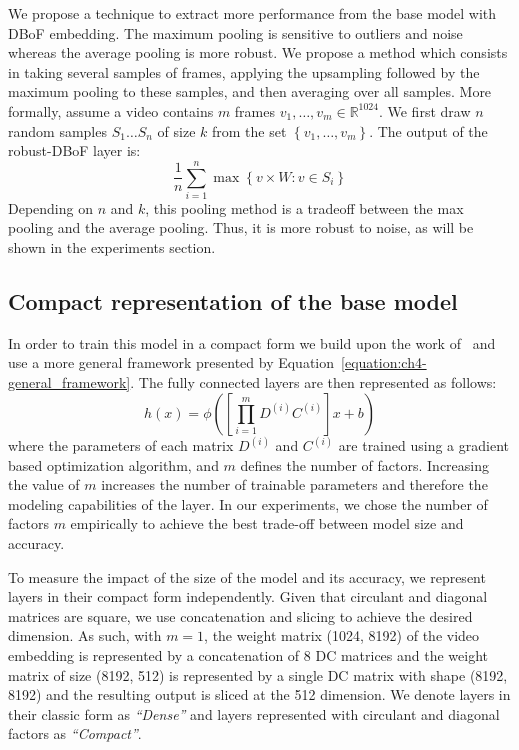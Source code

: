 We propose a technique to extract more performance from the base model with DBoF embedding.
The maximum pooling is sensitive to outliers and noise whereas the average pooling is more robust.
We propose a method which consists in taking several samples of frames, applying the upsampling followed by the maximum pooling to these samples, and then averaging over all samples.
More formally, assume a video contains $m$ frames $v_{1},\ldots,v_{m}\in\mathbb{R}^{1024}$.
We first draw $n$ random samples $S_{1}\ldots S_{n}$ of size $k$ from the set $\left\{ v_{1},\ldots,v_{m}\right\} $.
The output of the robust-DBoF layer is:
\begin{equation}
  \frac{1}{n}\sum_{i=1}^{n}\max\left\{ v\times W:v\in S_{i}\right\} 
\end{equation}
\noindent
Depending on $n$ and $k$, this pooling method is a tradeoff between the max pooling and the average pooling.
Thus, it is more robust to noise, as will be shown in the experiments section.


\subsection{Compact representation of the base model}
\label{subsection:ch4-compact}

In order to train this model in a compact form we build upon the work of~\cite{cheng} and use a more general framework presented by  Equation~\ref{equation:ch4-general_framework}.
The fully connected layers are then represented as follows:
\begin{equation}
  h(x) = \phi\left(\left[\prod_{i=1}^{m} D^{(i)} C^{(i)}\right]x + b\right)
\end{equation}
where the parameters of each matrix $D^{(i)}$ and $C^{(i)}$ are trained using a gradient based optimization algorithm, and $m$ defines the number of factors.
Increasing the value of $m$ increases the number of trainable parameters and therefore the modeling capabilities of the layer.
In our experiments, we chose the number of factors $m$ empirically to achieve the best trade-off between model size and accuracy.

To measure the impact of the size of the model and its accuracy, we represent layers in their compact form independently.
Given that circulant and diagonal matrices are square, we use concatenation and slicing to achieve the desired dimension.
As such, with $m=1$, the weight matrix (1024, 8192) of the video embedding is represented by a concatenation of 8 DC matrices and the weight matrix of size (8192, 512) is represented by a single DC matrix with shape (8192, 8192) and the resulting output is sliced at the 512 dimension.
We denote layers in their classic form as \emph{``Dense''} and layers represented with circulant and diagonal factors as \emph{``Compact''}.

